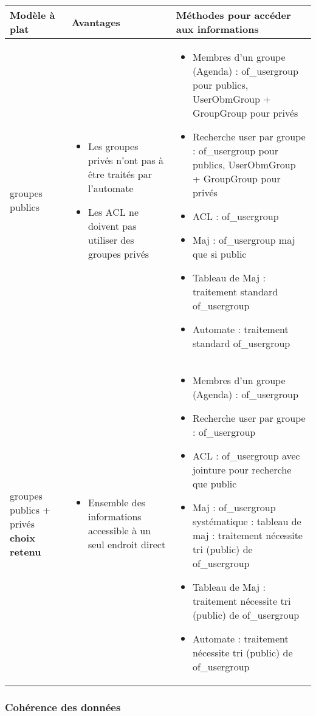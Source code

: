 \begin{tabular}{|p{2cm}|p{3.5cm}|p{8.5cm}|}
\hline
\textbf{Modèle à plat} & \textbf{Avantages} & \textbf{Méthodes pour accéder aux informations} \\
\hline
groupes publics &
\begin{itemize}
\item Les groupes privés n'ont pas à être traités par l'automate
\item Les ACL ne doivent pas utiliser des groupes privés
\end{itemize}
&
\begin{itemize}
\item Membres d'un groupe (Agenda) : of\_usergroup pour publics, UserObmGroup + GroupGroup pour privés
\item Recherche user par groupe : of\_usergroup pour publics, UserObmGroup + GroupGroup pour privés
\item ACL : of\_usergroup
\item Maj : of\_usergroup maj que si public
\item Tableau de Maj : traitement standard of\_usergroup
\item Automate : traitement standard of\_usergroup
\end{itemize}
\\
\hline
groupes publics + privés \textbf{choix retenu} &
\begin{itemize}
\item Ensemble des informations accessible à un seul endroit direct
\end{itemize}
&
\begin{itemize}
\item Membres d'un groupe (Agenda) : of\_usergroup
\item Recherche user par groupe : of\_usergroup
\item ACL : of\_usergroup avec jointure pour recherche que public
\item Maj : of\_usergroup systématique : tableau de maj : traitement nécessite tri (public) de of\_usergroup
\item Tableau de Maj : traitement nécessite tri (public) de of\_usergroup
\item Automate : traitement nécessite tri (public) de of\_usergroup
\end{itemize}
\\
\hline
\end{tabular}
\vspace{0.3cm}


\subsubsection{Cohérence des données}

